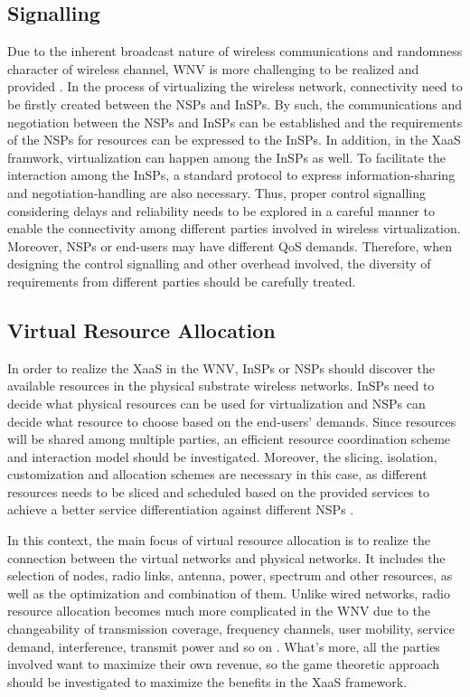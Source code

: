 \documentclass[12pt,draftclsnofoot,onecolumn]{IEEEtran}
\begin{document}
\subsection{Signalling}
Due to the inherent broadcast nature of wireless communications
and randomness character of wireless channel, WNV is more
challenging to be realized and provided \cite{Liang}. In the
process of virtualizing the wireless network, connectivity need to
be firstly created between the NSPs and InSPs. By such, the
communications and negotiation between the NSPs and InSPs can be
established and the requirements of the NSPs for resources can be
expressed to the InSPs. In addition, in the XaaS framwork,
virtualization can happen among the InSPs as well. To facilitate
the interaction among the InSPs, a standard protocol to express
information-sharing and negotiation-handling are also necessary.
Thus, proper control signalling considering delays and reliability
needs to be explored in a careful manner to enable the
connectivity among different parties involved in wireless
virtualization. Moreover, NSPs or end-users may have different QoS
demands. Therefore, when designing the control signalling and
other overhead involved, the diversity of requirements from
different parties should be carefully treated.

\subsection{Virtual Resource Allocation}

In order to realize the XaaS in the WNV, InSPs or NSPs should
discover the available resources in the physical substrate
wireless networks. InSPs need to decide what physical resources
can be used for virtualization and NSPs can decide what resource
to choose based on the end-users' demands. Since resources will be
shared among multiple parties, an efficient resource coordination
scheme and interaction model should be investigated. Moreover, the
slicing, isolation, customization and allocation schemes are
necessary in this case, as different resources needs to be sliced
and scheduled based on the provided services to achieve a better
service differentiation against different NSPs \cite{Nikaein}.\par

In this context, the main focus of virtual resource allocation is
to realize the connection between the virtual networks and
physical networks. It includes the selection of nodes, radio
links, antenna, power, spectrum and other resources, as well as
the optimization and combination of them. Unlike wired networks,
radio resource allocation becomes much more complicated in the WNV
due to the changeability of transmission coverage, frequency
channels, user mobility, service demand, interference, transmit
power and so on \cite{Moubayed}. What's more, all the parties
involved want to maximize their own revenue, so the game theoretic
approach should be investigated to maximize the benefits in the
XaaS framework.\par
\end{document}
